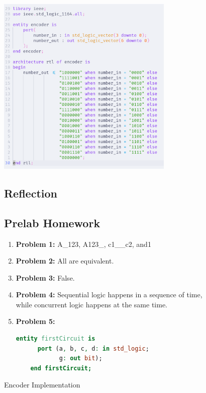 \documentclass{article}
\begin{document}
\begin{figure}[h]
  \centering
  \includegraphics[width=0.75\textwidth]{encoder.png}
  \caption{Encoder Implementation}
\subsection*{Reflection}

\subsection*{Prelab Homework}
\begin{enumerate}
  \item \textbf{Problem 1:} A\_123, A123\_, c1\_\_c2, and1
  \item \textbf{Problem 2:} All are equivalent.
  \item \textbf{Problem 3:} False.
  \item \textbf{Problem 4:} Sequential logic happens in a sequence of time, while concurrent logic happens at the same time.
  \item \textbf{Problem 5:} 
  \begin{lstlisting}[language=VHDL]
    entity firstCircuit is
      port (a, b, c, d: in std_logic;
            g: out bit);
    end firstCircuit;


\end{lstlisting}
\end{enumerate}
\end{figure}
\end{document}
